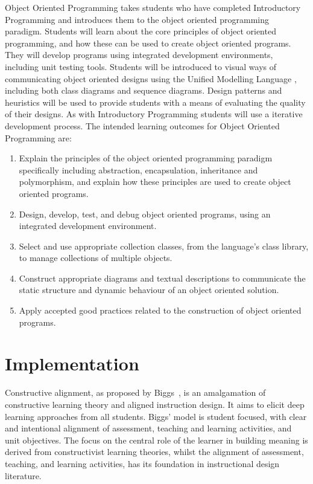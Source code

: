 Object Oriented Programming takes students who have completed Introductory Programming and introduces them to the object oriented programming paradigm. Students will learn about the core principles of object oriented programming, and how these can be used to create object oriented programs. They will develop programs using integrated development environments, including  unit testing tools. Students will be introduced to visual ways of communicating object oriented designs using the Unified Modelling Language \cite{Fowler:2004}, including both class diagrams and sequence diagrams. Design patterns and heuristics will be used to provide students with a means of evaluating the quality of their designs. As with Introductory Programming students will use a iterative development process. The intended learning outcomes for Object Oriented Programming are:
\begin{enumerate}
	\item Explain the principles of the object oriented programming paradigm specifically including abstraction, encapsulation, inheritance and polymorphism, and explain how these principles are used to create object oriented programs.
	\item Design, develop, test, and debug object oriented programs, using an integrated development environment.
	\item Select and use appropriate collection classes, from the language's class library, to manage collections of multiple objects.
	\item Construct appropriate diagrams and textual descriptions to communicate the static structure and dynamic behaviour of an object oriented solution.
	\item Apply accepted good practices related to the construction of object oriented programs.
\end{enumerate}

\section{Implementation} %
\label{sec:design}

Constructive alignment, as proposed by Biggs~\cite{Biggs:1996c}, is an amalgamation of constructive learning theory and aligned instruction design. It aims to elicit deep learning approaches from all students. Biggs' model is student focused, with clear and intentional alignment of assessment, teaching and learning activities, and unit objectives. The focus on the central role of the learner in building meaning is derived from constructivist learning theories, whilst the alignment of assessment, teaching, and learning activities, has its foundation in instructional design literature. 

